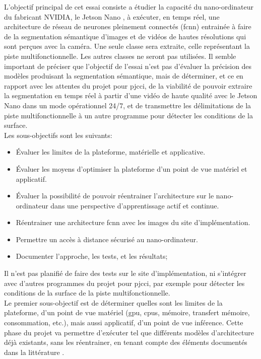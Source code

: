 ﻿\noindent L'objectif principal de cet essai consiste a étudier la capacité du nano-ordinateur du fabricant NVIDIA, le Jetson Nano \parencite{nvidia_jetson_2019}, à exécuter, en temps réel, une architecture de réseau de neurones pleinement connectés (\acrshort{fcnn}) entrainée à faire de la segmentation sémantique d'images et de vidéos de hautes résolutions qui sont perçues avec la caméra. Une seule classe sera extraite, celle représentant la piste multifonctionnelle. Les autres classes ne seront pas utilisées. Il semble important de préciser que l'objectif de l'essai n'est pas d'évaluer la précision des modèles produisant la segmentation sémantique, mais de déterminer, et ce en rapport avec les attentes du projet pour \acrshort{pjcci}, de la viabilité de pouvoir extraire la segmentation en temps réel à partir d'une vidéo de haute qualité avec le Jetson Nano dans un mode opérationnel 24/7, et de transmettre les délimitations de la piste multifonctionnelle à un autre programme pour détecter les conditions de la surface.
\vspace{\baselineskip}
\\
\noindent Les sous-objectifs sont les suivants: 
\begin{itemize}
   \item Évaluer les limites de la plateforme, matérielle et applicative.
   \item Évaluer les moyens d'optimiser la plateforme d'un point de vue matériel et applicatif. 
   \item Évaluer la possibilité de pouvoir réentrainer l'architecture sur le nano-ordinateur dans une perspective d'apprentissage actif et continue.
   \item Réentrainer une architecture \acrshort{fcnn} avec les images du site d'implémentation.
   \item Permettre un accès à distance sécurisé au nano-ordinateur.
   \item Documenter l'approche, les tests, et les résultats;
\end{itemize}
\vspace{\baselineskip}
\noindent Il n'est pas planifié de faire des tests sur le site d'implémentation, ni s'intégrer avec d'autres programmes du projet pour \acrshort{pjcci}, par exemple pour détecter les conditions de la surface de la piste multifonctionnelle. 
\vspace{\baselineskip}
\\
\noindent Le premier sous-objectif est de déterminer quelles sont les limites de la plateforme, d'un point de vue matériel (\acrshort{gpu}, \acrshort{cpu}s, mémoire, transfert mémoire, consommation, etc.), mais aussi applicatif, d'un point de vue inférence. Cette phase du projet va permettre d'exécuter tel que différents modèles d'architecture déjà existants, sans les réentrainer, en tenant compte des éléments documentés dans la littérature \parencite{nguyen_mavnet_2019, zheng_real-time_2020, nvidia_jetson_2019-1}.
